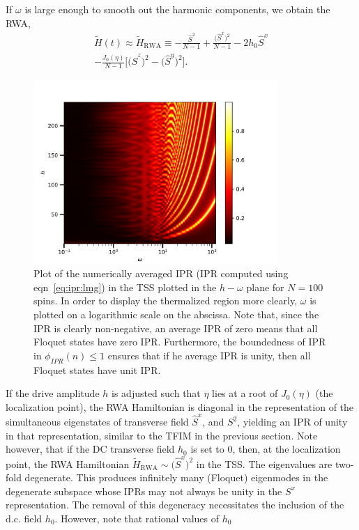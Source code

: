 \documentclass[%
reprint,
superscriptaddress,
linenumbers,
amsmath,amssymb,
aps,
prb,
showkeys,
]{revtex4-2}
\begin{document}
	If $\omega$ is large enough to smooth out the harmonic components, we obtain the RWA,
	\begin{multline}
	\tilde{H}(t)\approx \tilde{H}_{\mathrm{RWA}}\equiv -\frac{\hat{S}^2}{N-1} +  \frac{\big(\hat{S}^x\big)^{2}}{N-1} - 2h_0 \hat{S}^x\\
	 - \frac{J_0(\eta)}{N-1}\bigg[\big(\hat{S}^z\big)^{2} - \big(\hat{S}^y\big)^{2} \bigg].
			\label{eq:lmg_rwa}
	\end{multline}
		\begin{figure}[t!]
	\centering
	\includegraphics[width=9.3cm]{wh_phasespace.jpeg }
	\caption{Plot of the numerically averaged IPR (IPR computed using eqn~\ref{eq:ipr:lmg}) in the TSS plotted in the $h-\omega$ plane for $N=100$ spins. In order to display the thermalized region more clearly, $\omega$ is plotted on a logarithmic scale on the abscissa. Note that, since the IPR is clearly non-negative, an average IPR of zero means that all Floquet states have zero IPR. Furthermore, the boundedness of IPR in $\phi_{IPR}(n) \leq 1$ ensures that if he average IPR is unity, then all Floquet states have unit IPR.}
	\label{fig:lmg_phasediag}
	\end{figure}
	If the drive amplitude $h$ is adjusted such that $\eta$ lies at a root of $J_0(\eta)$ (the localization point), the RWA Hamiltonian is diagonal in the representation of the simultaneous eigenstates of transverse field $\hat{S}^x$, and $S^2$, yielding an IPR of unity in that representation, similar to the TFIM in the previous section. Note however, that if the DC transverse field $h_0$ is set to $0$, then, at the localization point, the RWA Hamiltonian $\tilde{H}_{\mathrm{RWA}}\sim
	\big(\hat{S}^x\big)^2$ in the TSS. The eigenvalues are two-fold degenerate. This produces infinitely many (Floquet) eigenmodes in the degenerate subspace whose IPRs may not always be unity in the $S^x$ representation. The removal of this degeneracy necessitates the inclusion of the d.c. field $h_0$. However, note that rational values of $h_0$
\end{document}

